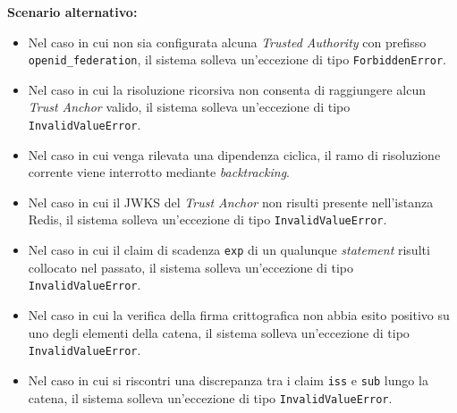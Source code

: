 \noindent\textbf{Scenario alternativo:}
\begin{itemize}
    \item Nel caso in cui non sia configurata alcuna \textit{Trusted Authority} con prefisso \texttt{openid\_\allowbreak{}federation}, il sistema solleva un'eccezione di tipo \texttt{ForbiddenError}.
    \item Nel caso in cui la risoluzione ricorsiva non consenta di raggiungere alcun \textit{Trust Anchor} valido, il sistema solleva un'eccezione di tipo \texttt{InvalidValueError}.
    \item Nel caso in cui venga rilevata una dipendenza ciclica, il ramo di risoluzione corrente viene interrotto mediante \textit{backtracking}.
    \item Nel caso in cui il JWKS del \textit{Trust Anchor} non risulti presente nell'istanza Redis, il sistema solleva un'eccezione di tipo \texttt{InvalidValueError}.
    \item Nel caso in cui il claim di scadenza \texttt{exp} di un qualunque \textit{statement} risulti collocato nel passato, il sistema solleva un'eccezione di tipo \texttt{InvalidValueError}.
    \item Nel caso in cui la verifica della firma crittografica non abbia esito positivo su uno degli elementi della catena, il sistema solleva un'eccezione di tipo \texttt{InvalidValueError}.
    \item Nel caso in cui si riscontri una discrepanza tra i claim \texttt{iss} e \texttt{sub} lungo la catena, il sistema solleva un'eccezione di tipo \texttt{InvalidValueError}.
\end{itemize}

